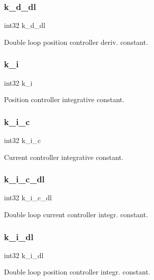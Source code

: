 \subsubsection{k\+\_\+d\+\_\+dl}
{\footnotesize\ttfamily int32 k\+\_\+d\+\_\+dl}

Double loop position controller deriv. constant. \mbox{\label{structst__mem_ad62fb8a39e2de160e14be47e3ff08014}} 
\subsubsection{k\+\_\+i}
{\footnotesize\ttfamily int32 k\+\_\+i}

Position controller integrative constant. \mbox{\label{structst__mem_a942ea80eb197a70dd0ba3da33d1e6c6e}} 
\subsubsection{k\+\_\+i\+\_\+c}
{\footnotesize\ttfamily int32 k\+\_\+i\+\_\+c}

Current controller integrative constant. \mbox{\label{structst__mem_afc912f90d6ba2f39046a0daf0207f116}} 
\subsubsection{k\+\_\+i\+\_\+c\+\_\+dl}
{\footnotesize\ttfamily int32 k\+\_\+i\+\_\+c\+\_\+dl}

Double loop current controller integr. constant. \mbox{\label{structst__mem_ab5c86695ff730d3387a8c6b089945a7e}} 
\subsubsection{k\+\_\+i\+\_\+dl}
{\footnotesize\ttfamily int32 k\+\_\+i\+\_\+dl}

Double loop position controller integr. constant. \mbox{\label{structst__mem_ad1bc394122aa9760c3fc2887a1891cd8}} 
